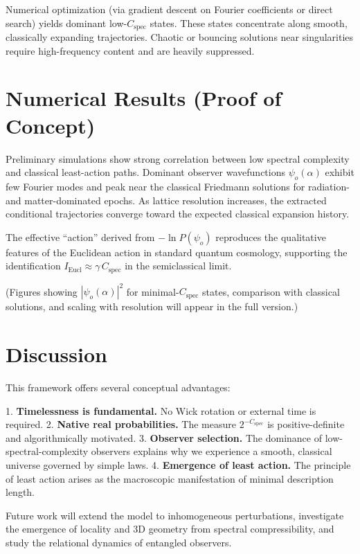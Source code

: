 \documentclass[11pt]{article}
\begin{document}
Numerical optimization (via gradient descent on Fourier coefficients or direct search) yields dominant low-\(C_{\text{spec}}\) states.
These states concentrate along smooth, classically expanding trajectories.
Chaotic or bouncing solutions near singularities require high-frequency content and are heavily suppressed.

\section{Numerical Results (Proof of Concept)}

Preliminary simulations show strong correlation between low spectral complexity and classical least-action paths.
Dominant observer wavefunctions \(\psi_o(\alpha)\) exhibit few Fourier modes and peak near the classical Friedmann solutions for radiation- and matter-dominated epochs.
As lattice resolution increases, the extracted conditional trajectories converge toward the expected classical expansion history.

The effective ``action'' derived from \(-\ln P(\psi_o)\) reproduces the qualitative features of the Euclidean action in standard quantum cosmology, supporting the identification \(I_{\text{Eucl}} \approx \gamma \, C_{\text{spec}}\) in the semiclassical limit.

(Figures showing \(|\psi_o(\alpha)|^2\) for minimal-\(C_{\text{spec}}\) states, comparison with classical solutions, and scaling with resolution will appear in the full version.)

\section{Discussion}

This framework offers several conceptual advantages:

1. \textbf{Timelessness is fundamental.} No Wick rotation or external time is required.
2. \textbf{Native real probabilities.} The measure \(2^{-C_{\text{spec}}}\) is positive-definite and algorithmically motivated.
3. \textbf{Observer selection.} The dominance of low-spectral-complexity observers explains why we experience a smooth, classical universe governed by simple laws.
4. \textbf{Emergence of least action.} The principle of least action arises as the macroscopic manifestation of minimal description length.

Future work will extend the model to inhomogeneous perturbations, investigate the emergence of locality and 3D geometry from spectral compressibility, and study the relational dynamics of entangled observers.
\end{document}
